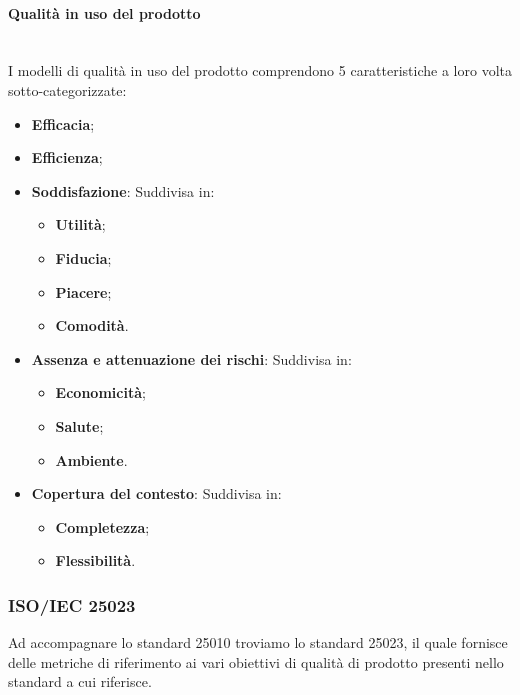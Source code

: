 \paragraph {Qualità in uso del prodotto}\mbox{}\\
I modelli di qualità in uso del prodotto comprendono 5 caratteristiche a loro volta sotto-categorizzate:
\begin{itemize}
	\item \textbf{Efficacia};
	\item \textbf{Efficienza}; 
	\item \textbf{Soddisfazione}: Suddivisa in:
	\begin{itemize}
		\item \textbf{Utilità};
		\item \textbf{Fiducia};
		\item \textbf{Piacere};
		\item \textbf{Comodità}.
	\end{itemize}
	\item \textbf{Assenza e attenuazione dei rischi}: Suddivisa in:
	\begin{itemize}
		\item \textbf{Economicità};
		\item \textbf{Salute};
		\item \textbf{Ambiente}.
	\end{itemize}
	\item \textbf{Copertura del contesto}: Suddivisa in:
	\begin{itemize}
		\item \textbf{Completezza};
		\item \textbf{Flessibilità}.
	\end{itemize}
\end{itemize}
\subsubsection{ISO/IEC 25023}
Ad accompagnare lo standard 25010 troviamo lo standard 25023, il quale fornisce delle metriche di riferimento ai vari obiettivi di qualità di prodotto presenti nello standard a cui riferisce.





